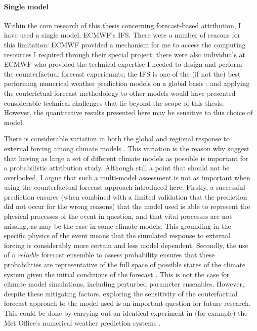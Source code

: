   \paragraph*{Single model}

    Within the core research of this thesis concerning forecast-based attribution, I have used a single model, ECMWF's IFS. There were a number of reasons for this limitation: ECMWF provided a mechanism for me to access the computing resources I required through their special project; there were also individuals at ECMWF who provided the technical expertise I needed to design and perform the counterfactual forecast experiemnts; the IFS is one of the (if not the) best performing numerical weather prediction models on a global basis \citep{hagedorn_comparing_2012}; and applying the couterfctual forecast methodology to other models would have presented considerable technical challenges that lie beyond the scope of this thesis. However, the quantitative results presented here may be sensitive to this choice of model. 
    
    There is considerable variation in both the global and regional response to external forcing among climate models \cite{meehl_context_2020,seneviratne_regional_2020,masson-delmotte_human_2021,masson-delmotte_earths_2021,masson-delmotte_linking_2021,masson-delmotte_weather_2021}. This variation is the reason why \citet{philip_protocol_2020} suggest that having as large a set of different climate models as possible is important for a probabilistic attribution study. Although still a point that should not be overlooked, I argue that such a multi-model assessment is not as important when using the counterfactual forecast approach introduced here. Firstly, a successful prediction ensures (when combined with a limited validation that the prediction did not occur for the wrong reasons) that the model used is able to represent the physical processes of the event in question, and that vital processes are not missing, as may be the case in some climate models. This grounding in the specific physics of the event means that the simulated response to external forcing is considerably more certain and less model dependent. Secondly, the use of a \emph{reliable} forecast ensemble to assess probability ensures that these probabilities are representative of the full space of possible states of the climate system given the initial conditions of the forecast \citep{murphy_new_1973}. This is not the case for climate model simulations, including perturbed parameter ensembles. However, despite these mitigating factors, exploring the sensitivity of the couterfactual forecast approach to the model used is an important question for future research. This could be done by carrying out an identical experiment in (for example) the Met Office's numerical weather prediction systems \citep{walters_met_2017,maclachlan_global_2015}.

